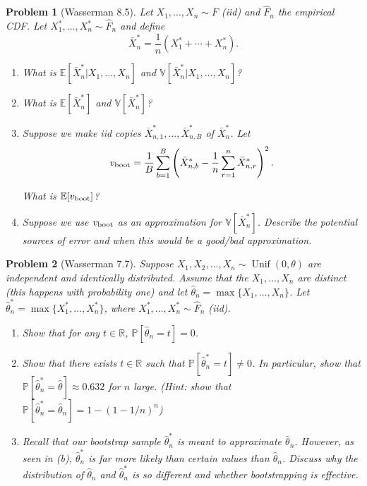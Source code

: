 \documentclass{article}
\newtheorem{problem}{Problem}
\newcommand{\PP}{\mathbb{P}}
\newcommand{\EE}{\mathbb{E}}
\newcommand{\VV}{\mathbb{V}}
\begin{document}
\begin{problem}[Wasserman 8.5]
    Let $X_1, \ldots, X_n \sim F$ (iid) and $\hat{F}_n$ the empirical CDF.
    Let $X_1^*, \ldots, X_n^* \sim \hat{F}_n$ and define
    \begin{equation*}
        \bar{X}_n^* = \frac{1}{n} (X_1^* + \cdots + X_n^*).
    \end{equation*}
    
    \begin{enumerate}[label=(\alph*),topsep=0pt]
        \item What is $\EE[\bar{X}_n^*|X_1, \ldots, X_n]$ and $\VV[\bar{X}_n^*|X_1, \ldots, X_n]$?
        \item What is $\EE[\bar{X}_n^*]$ and $\VV[\bar{X}_n^*]$?
        \item Suppose we make iid copies $\bar{X}_{n,1}^*, \ldots, \bar{X}_{n,B}^*$ of $\bar{X}_n^*$.
            Let
            \begin{equation*}
                v_{\textup{boot}} = \frac{1}{B} \sum_{b=1}^{B} \left( \bar{X}_{n,b}^* - \frac{1}{n} \sum_{r=1}^{n} \bar{X}_{n,r}^* \right)^2.
            \end{equation*}

            What is $\EE[v_{\textup{boot}}]$? 

        \item Suppose we use $v_{\textup{boot}}$ as an approximation for $\VV[\bar{X}_n^*]$.
            Describe the potential sources of error and when this would be a good/bad approximation.

    \end{enumerate}
\end{problem}


\begin{problem}[Wasserman 7.7]
    Suppose $X_1, X_2, \ldots, X_n \sim \operatorname{Unif}(0,\theta)$ are independent and identically distributed. 
    Assume that the $X_1, \ldots, X_n$ are distinct (this happens with probability one) and let $\hat{\theta}_n = \max\{X_1, \ldots, X_n\}$.
    Let $\hat{\theta}_n^* = \max\{X_1^*, \ldots, X_n^*\}$, where $X_1^*, \ldots, X_n^* \sim \hat{F}_n$ (iid).


    \begin{enumerate}[label=(\alph*),topsep=0pt]
        \item Show that for any $t\in\mathbb{R}$, $\PP[\hat{\theta}_n = t] = 0$. 
        \item Show that there exists $t\in \mathbb{R}$ such that $\PP[\hat{\theta}_n^* = t] \neq 0 $. In particular, show that $\PP[\hat{\theta}_n^* = \hat{\theta}] \approx 0.632$ for $n$ large. (Hint: show that $\PP[\hat{\theta}_n^* = \hat{\theta}_n] = 1-(1-1/n)^n$)
        \item Recall that our bootstrap sample $\hat{\theta}_n^*$ is meant to approximate $\hat{\theta}_n$. 
            However, as seen in (b), $\hat{\theta}_n^*$ is far more likely than certain values than $\hat{\theta}_n$.
        Discuss why the distribution of $\hat{\theta}_n$ and $\hat{\theta}_n^*$ is so different and whether bootstrapping is effective.
    \end{enumerate}
\end{problem}
\end{document}
